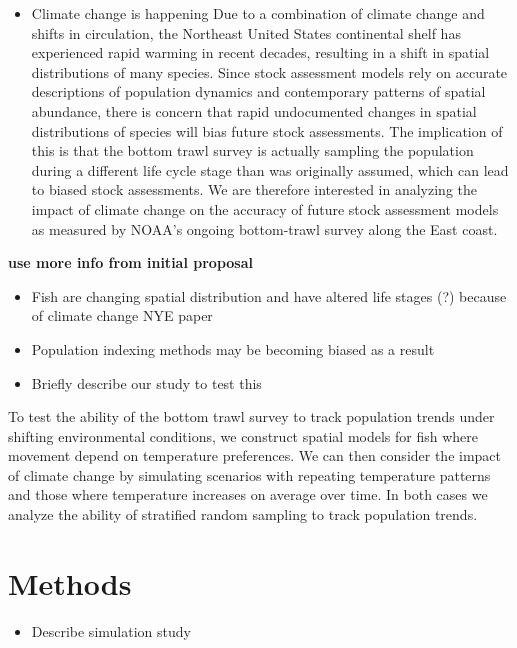 \documentclass[
]{article}
\providecommand{\tightlist}{%
  \setlength{\itemsep}{0pt}\setlength{\parskip}{0pt}}
\begin{document}
\begin{itemize}
\tightlist
\item
  Climate change is happening
  Due to a combination of climate change and shifts in circulation, the Northeast United States continental shelf has experienced rapid warming in recent decades, resulting in a shift in spatial distributions of many species. Since stock assessment models rely on accurate descriptions of population dynamics and contemporary patterns of spatial abundance, there is concern that rapid undocumented changes in spatial distributions of species will bias future stock assessments. The implication of this is that the bottom trawl survey is actually sampling the population during a different life cycle stage than was originally assumed, which can lead to biased stock assessments. We are therefore interested in analyzing the impact of climate change on the accuracy of future stock assessment models as measured by NOAA's ongoing bottom-trawl survey along the East coast.
\end{itemize}

\textbf{use more info from initial proposal}

\begin{itemize}
\item
  Fish are changing spatial distribution and have altered life stages (?) because of climate change
  NYE paper
\item
  Population indexing methods may be becoming biased as a result
\item
  Briefly describe our study to test this
\end{itemize}

To test the ability of the bottom trawl survey to track population trends under shifting environmental conditions, we construct spatial models for fish where movement depend on temperature preferences. We can then consider the impact of climate change by simulating scenarios with repeating temperature patterns and those where temperature increases on average over time. In both cases we analyze the ability of stratified random sampling to track population trends.

\section{Methods}

\begin{itemize}
\tightlist
\item
  Describe simulation study
\end{itemize}
\end{document}
